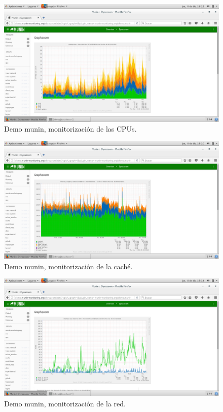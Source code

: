 \begin{figure}[H] 
	\centering
	\includegraphics[width=14.7cm]{./img/ejercicio6_1.png} 	
	\caption{Demo munin, monitorización de las CPUs.} \label{fig:ejercicio6_1}
\end{figure}

\begin{figure}[H] 
	\centering
	\includegraphics[width=14.7cm]{./img/ejercicio6_2.png} 	
	\caption{Demo munin, monitorización de la caché.} \label{fig:ejercicio6_2}
\end{figure}

\begin{figure}[H] 
	\centering
	\includegraphics[width=14.7cm]{./img/ejercicio6_3.png} 	
	\caption{Demo munin, monitorización de la red.} \label{fig:ejercicio6_3}
\end{figure}


